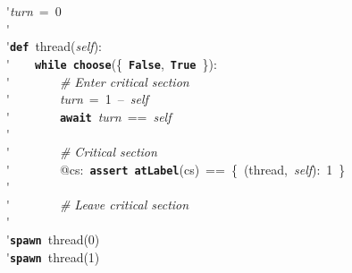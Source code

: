 \'\>\textit{turn}~=~0\\

\'\>\\

\'\>\texttt{\textbf{def}}~thread(\textit{self}):\\

\'\>~~~~\texttt{\textbf{while}}~\texttt{\textbf{choose}}(\{~\texttt{\textbf{False}},~\texttt{\textbf{True}}~\}):\\

\'\>~~~~~~~~\emph{\# Enter critical section}\\

\'\>~~~~~~~~\textit{turn}~=~1~--~\textit{self}\\

\'\>~~~~~~~~\texttt{\textbf{await}}~\textit{turn}~==~\textit{self}\\

\'\>\\

\'\>~~~~~~~~\emph{\# Critical section}\\

\'\>~~~~~~~~@cs:~\texttt{\textbf{assert}}~\texttt{\textbf{atLabel}}(cs)~==~\{~(thread,~\textit{self}):~1~\}\\

\'\>\\

\'\>~~~~~~~~\emph{\# Leave critical section}\\

\'\>\\

\'\>\texttt{\textbf{spawn}}~thread(0)\\

\'\>\texttt{\textbf{spawn}}~thread(1)